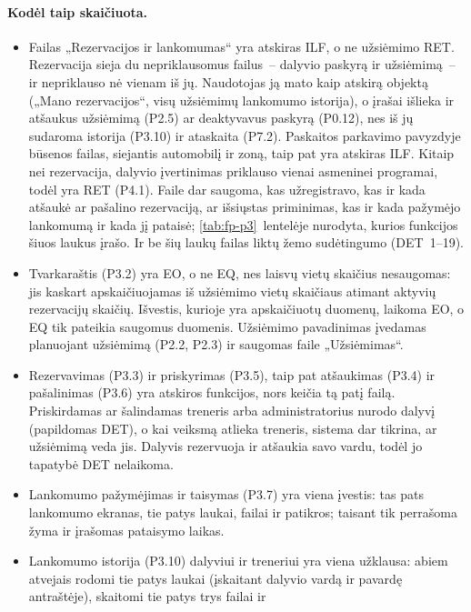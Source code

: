 \paragraph{Kodėl taip skaičiuota.}
\begin{itemize}
  \item Failas „Rezervacijos ir lankomumas“ yra atskiras ILF, o ne
    užsiėmimo RET. Rezervacija sieja du nepriklausomus failus~– dalyvio
    paskyrą ir užsiėmimą~– ir nepriklauso nė vienam iš jų. Naudotojas ją
    mato kaip atskirą objektą („Mano rezervacijos“, visų užsiėmimų lankomumo
    istorija), o įrašai išlieka ir atšaukus užsiėmimą (P2.5) ar
    deaktyvavus paskyrą (P0.12), nes iš jų sudaroma istorija (P3.10) ir
    ataskaita (P7.2). Paskaitos parkavimo pavyzdyje būsenos failas,
    siejantis automobilį ir zoną, taip pat yra atskiras ILF. Kitaip nei
    rezervacija, dalyvio įvertinimas priklauso vienai asmeninei programai,
    todėl yra RET (P4.1). Faile dar saugoma, kas užregistravo, kas ir kada
    atšaukė ar pašalino rezervaciją, ar išsiųstas priminimas, kas ir kada
    pažymėjo lankomumą ir kada jį pataisė; \ref{tab:fp-p3}~lentelėje nurodyta,
    kurios funkcijos šiuos laukus įrašo. Ir be šių laukų failas liktų žemo
    sudėtingumo (DET~1–19).
  \item Tvarkaraštis (P3.2) yra EO, o ne EQ, nes laisvų vietų skaičius
    nesaugomas: jis kaskart apskaičiuojamas iš užsiėmimo vietų skaičiaus
    atimant aktyvių rezervacijų skaičių. Išvestis, kurioje yra apskaičiuotų duomenų, laikoma EO,
    o EQ tik pateikia saugomus duomenis. Užsiėmimo pavadinimas įvedamas
    planuojant užsiėmimą (P2.2, P2.3) ir saugomas faile „Užsiėmimas“.
  \item Rezervavimas (P3.3) ir priskyrimas (P3.5), taip pat atšaukimas
    (P3.4) ir pašalinimas (P3.6) yra atskiros funkcijos, nors keičia tą
    patį failą. Priskirdamas ar šalindamas treneris arba administratorius
    nurodo dalyvį (papildomas DET), o kai veiksmą atlieka treneris, sistema
    dar tikrina, ar užsiėmimą veda jis. Dalyvis rezervuoja ir atšaukia savo
    vardu, todėl jo tapatybė DET nelaikoma.
  \item Lankomumo pažymėjimas ir taisymas (P3.7) yra viena įvestis: tas
    pats lankomumo ekranas, tie patys laukai, failai ir patikros; taisant
    tik perrašoma žyma ir įrašomas pataisymo laikas.
  \item Lankomumo istorija (P3.10) dalyviui ir treneriui yra viena
    užklausa: abiem atvejais rodomi tie patys laukai (įskaitant dalyvio
    vardą ir pavardę antraštėje), skaitomi tie patys trys failai ir

\end{itemize}
